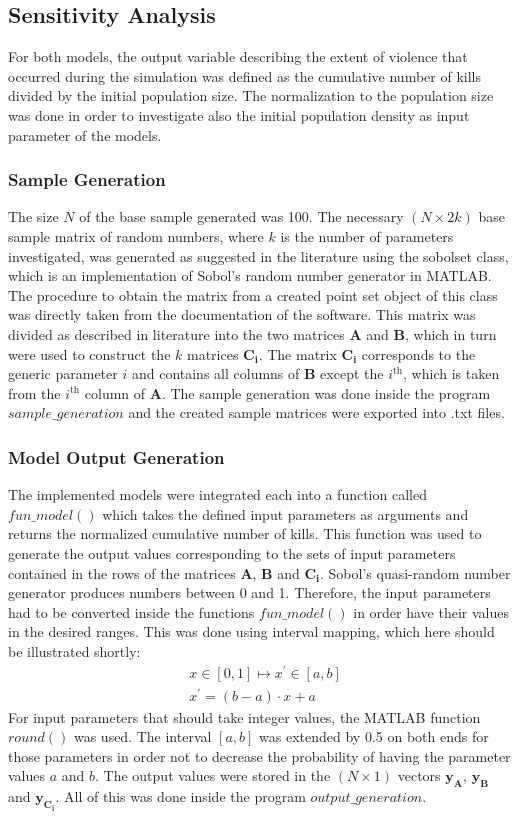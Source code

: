 \documentclass[11pt]{article}
\begin{document}
\subsection{Sensitivity Analysis}
For both models, the output variable describing the extent of violence that occurred during the simulation was defined as the cumulative number of kills divided by the initial population size. The normalization to the population size was done in order to investigate also the initial population density as input parameter of the models.

\subsubsection{Sample Generation}
The size $N$ of the base sample generated was 100. The necessary $(N \times 2k)$ base sample matrix of random numbers, where $k$ is the number of parameters investigated, was generated as suggested in the literature using the sobolset class, which is an implementation of Sobol's random number generator in MATLAB. The procedure to obtain the matrix from a created point set object of this class was directly taken from the documentation of the software. This matrix was divided as described in literature into the two matrices $\boldsymbol{A}$ and $\boldsymbol{B}$, which in turn were used to construct the $k$ matrices $\boldsymbol{C_i}$. The matrix $\boldsymbol{C_i}$ corresponds to the generic parameter $i$ and contains all columns of $\boldsymbol{B}$ except the $i^{\text{th}}$, which is taken from the $i^{\text{th}}$ column of $\boldsymbol{A}$. The sample generation was done inside the program $sample\_generation$ and the created sample matrices were exported into .txt files.

\subsubsection{Model Output Generation}
The implemented models were integrated each into a function called $fun\_model()$ which takes the defined input parameters as arguments and returns the normalized cumulative number of kills. This function was used to generate the output values corresponding to the sets of input parameters contained in the rows of the matrices $\boldsymbol{A}$, $\boldsymbol{B}$ and $\boldsymbol{C_i}$. Sobol's quasi-random number generator produces numbers between 0 and 1. Therefore, the input parameters had to be converted inside the functions $fun\_model()$ in order have their values in the desired ranges. This was done using interval mapping, which here should be illustrated shortly:
\begin{align*}
& x \in [0,1] \longmapsto x^\prime \in [a,b]\\
&x^\prime = (b-a) \cdot x + a
\end{align*}
For input parameters that should take integer values, the MATLAB function $round()$ was used. The interval $[a,b]$ was extended by 0.5 on both ends for those parameters in order not to decrease the probability of having the parameter values $a$ and $b$. The output values were stored in the $(N \times 1)$ vectors $\boldsymbol{y_A}$, $\boldsymbol{y_B}$ and $\boldsymbol{y_{C_i}}$. All of this was done inside the program $output\_generation$.
\end{document}
